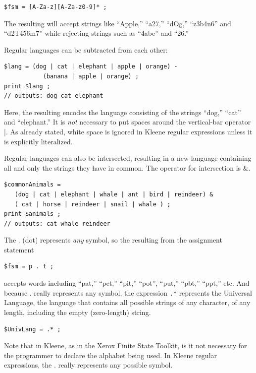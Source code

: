 \begin{Verbatim}
$fsm = [A-Za-z][A-Za-z0-9]* ;
\end{Verbatim}

\noindent
The resulting \fsm{} will accept strings like ``Apple,'' ``a27,'' ``dOg,''
``z3b4n6'' and
``d2T456m7'' while rejecting strings such as ``4abc'' and ``26.''

Regular languages can be subtracted from each other:

\begin{Verbatim}
$lang = (dog | cat | elephant | apple | orange) - 
           (banana | apple | orange) ;
print $lang ;
// outputs: dog cat elephant
\end{Verbatim}

\noindent
Here, the resulting \fsm{} encodes the language consisting of the strings ``dog,'' ``cat'' and ``elephant.''
It is \emph{not} necessary to put spaces around the vertical-bar operator |.
As already stated, white space is ignored in Kleene regular expressions
unless it is explicitly literalized.

Regular languages can also be intersected, resulting in a new language
containing all and only the strings they have in common.
The operator for intersection is \&.

\begin{Verbatim}
$commonAnimals = 
   (dog | cat | elephant | whale | ant | bird | reindeer) & 
   ( cat | horse | reindeer | snail | whale ) ; 
print $animals ;
// outputs: cat whale reindeer
\end{Verbatim}

The . (dot) represents \emph{any} symbol, so the \fsm{} resulting from the
assignment statement

\begin{Verbatim}
$fsm = p . t ;
\end{Verbatim}

\noindent
accepts words including ``pat,'' ``pet,'' ``pit,'' ``pot'',
``put,'' ``pbt,'' ``ppt,'' etc.  And because . really 
represents any symbol, the expression
\verb!.*! represents the Universal Language, the language that contains all possible
strings of any character, of any length, including the empty (zero-length) string.

\begin{Verbatim}
$UnivLang = .* ;
\end{Verbatim}

\noindent
Note that in Kleene, as in the Xerox Finite State Toolkit, is it not necessary
for the programmer to declare the alphabet being used.  In Kleene regular
expressions, the . really represents any possible symbol.

